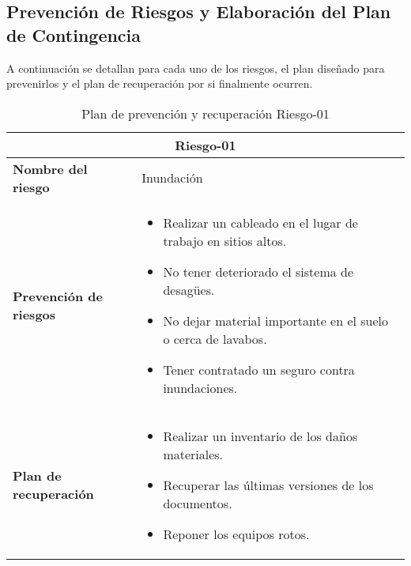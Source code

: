 \subsection{Prevención de Riesgos y Elaboración del Plan de Contingencia}

\par A continuación se detallan para cada uno de los riesgos, el plan diseñado para prevenirlos y el plan de recuperación por si finalmente ocurren.

\begin{table}[H]
\begin{center}
\begin{tabular}{p{} p{10cm}}
\multicolumn{2}{c}{\textbf{Riesgo-01} } \\
\hline \hline
\textbf{Nombre del riesgo} & Inundación \\
\hline
\textbf{Prevención de riesgos} & \begin{itemize}[-]
  \item Realizar un cableado en el lugar de trabajo en sitios altos.
  \item No tener deteriorado el sistema de desagües.
  \item No dejar material importante en el suelo o cerca de lavabos.
  \item Tener contratado un seguro contra inundaciones.
  \end{itemize} \\
\hline
\textbf{Plan de recuperación} &   \begin{itemize}[-]
  \item Realizar un inventario de los daños materiales.
  \item Recuperar las últimas versiones de los documentos.
  \item Reponer los equipos rotos.
  \end{itemize}\\
\hline
\end{tabular}
\caption{Plan de prevención y recuperación Riesgo-01}
\label{tab:Riesgo-01-Prev_Recup}
\end{center}
\end{table}


